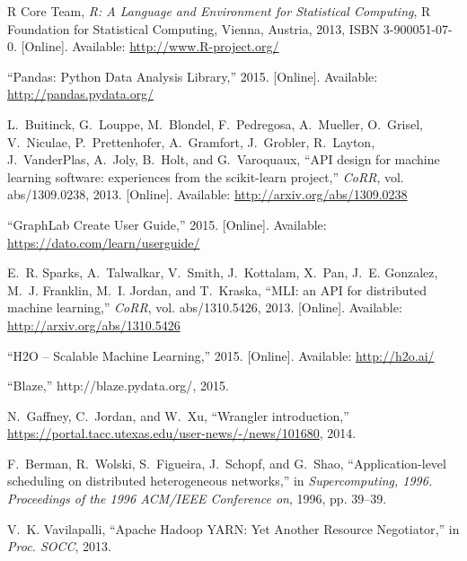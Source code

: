 \documentclass{sig-alternate}
\begin{document}
\begin{thebibliography}{10}
\BIBentryALTinterwordspacing
{R Core Team}, \emph{R: A Language and Environment for Statistical Computing},
  R Foundation for Statistical Computing, Vienna, Austria, 2013, {ISBN}
  3-900051-07-0. [Online]. Available: \url{http://www.R-project.org/}
\BIBentrySTDinterwordspacing

\BIBentryALTinterwordspacing
``{Pandas: Python Data Analysis Library},'' 2015. [Online]. Available:
  \url{http://pandas.pydata.org/}
\BIBentrySTDinterwordspacing

\BIBentryALTinterwordspacing
L.~Buitinck, G.~Louppe, M.~Blondel, F.~Pedregosa, A.~Mueller, O.~Grisel,
  V.~Niculae, P.~Prettenhofer, A.~Gramfort, J.~Grobler, R.~Layton,
  J.~VanderPlas, A.~Joly, B.~Holt, and G.~Varoquaux, ``{API} design for machine
  learning software: experiences from the scikit-learn project,'' \emph{CoRR},
  vol. abs/1309.0238, 2013. [Online]. Available:
  \url{http://arxiv.org/abs/1309.0238}
\BIBentrySTDinterwordspacing

\BIBentryALTinterwordspacing
``{GraphLab Create User Guide},'' 2015. [Online]. Available:
  \url{https://dato.com/learn/userguide/}
\BIBentrySTDinterwordspacing

\BIBentryALTinterwordspacing
E.~R. Sparks, A.~Talwalkar, V.~Smith, J.~Kottalam, X.~Pan, J.~E. Gonzalez,
  M.~J. Franklin, M.~I. Jordan, and T.~Kraska, ``{MLI:} an {API} for
  distributed machine learning,'' \emph{CoRR}, vol. abs/1310.5426, 2013.
  [Online]. Available: \url{http://arxiv.org/abs/1310.5426}
\BIBentrySTDinterwordspacing

\BIBentryALTinterwordspacing
``{H2O -- Scalable Machine Learning},'' 2015. [Online]. Available:
  \url{http://h2o.ai/}
\BIBentrySTDinterwordspacing

``Blaze,'' {http://blaze.pydata.org/}, 2015.

N.~Gaffney, C.~Jordan, and W.~Xu, ``Wrangler introduction,''
  \url{https://portal.tacc.utexas.edu/user-news/-/news/101680}, 2014.

F.~Berman, R.~Wolski, S.~Figueira, J.~Schopf, and G.~Shao, ``Application-level
  scheduling on distributed heterogeneous networks,'' in \emph{Supercomputing,
  1996. Proceedings of the 1996 ACM/IEEE Conference on}, 1996, pp. 39--39.

V.~K. Vavilapalli, ``{Apache Hadoop YARN: Yet Another Resource Negotiator},''
  in \emph{Proc. SOCC}, 2013.


\end{thebibliography}
\end{document}
